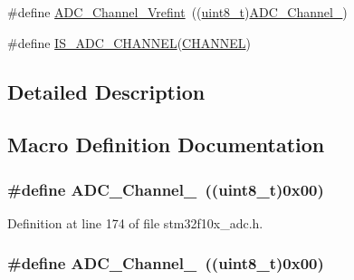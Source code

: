 \begin{DoxyCompactItemize}
\item 
\#define \hyperlink{group___a_d_c__channels_ga5d48ded5138e6f1efe3a7634eff4d125}{A\+D\+C\+\_\+\+Channel\+\_\+\+Vrefint}~((\hyperlink{_p_e___types_8h_aba7bc1797add20fe3efdf37ced1182c5}{uint8\+\_\+t})\hyperlink{openmotestm_2library_2inc_2stm32f10x__adc_8h_a58cdfe3a5625f198116d163b09698cea}{A\+D\+C\+\_\+\+Channel\+\_})
\item 
\#define \hyperlink{group___a_d_c__channels_gaba41910dcb2b449c613a5ef638862e77}{I\+S\+\_\+\+A\+D\+C\+\_\+\+C\+H\+A\+N\+N\+EL}(\hyperlink{samr21__xpro_200std__low__power__mode_200std__low__power__mode_8c_ace6a11e892466500d47d1f45f042bc53}{C\+H\+A\+N\+N\+EL})
\end{DoxyCompactItemize}


\subsection{Detailed Description}


\subsection{Macro Definition Documentation}
\subsubsection[{\texorpdfstring{A\+D\+C\+\_\+\+Channel\+\_\+0}{ADC_Channel_0}}]{\setlength{\rightskip}{0pt plus 5cm}\#define A\+D\+C\+\_\+\+Channel\+\_~(({\bf uint8\+\_\+t})0x00)}\hypertarget{group___a_d_c__channels_ga40ec353803e9470a5721ef5bf0b1ab24}{}\label{group___a_d_c__channels_ga40ec353803e9470a5721ef5bf0b1ab24}


Definition at line 174 of file stm32f10x\+\_\+adc.\+h.

\subsubsection[{\texorpdfstring{A\+D\+C\+\_\+\+Channel\+\_\+0}{ADC_Channel_0}}]{\setlength{\rightskip}{0pt plus 5cm}\#define A\+D\+C\+\_\+\+Channel\+\_~(({\bf uint8\+\_\+t})0x00)}\hypertarget{group___a_d_c__channels_ga40ec353803e9470a5721ef5bf0b1ab24}{}\label{group___a_d_c__channels_ga40ec353803e9470a5721ef5bf0b1ab24}


